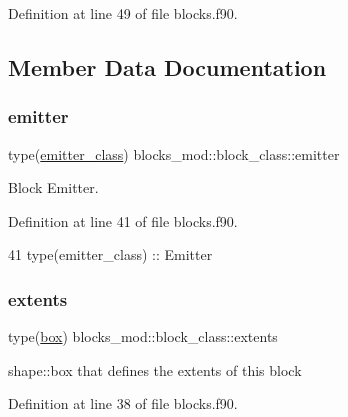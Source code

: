 Definition at line 49 of file blocks.\+f90.



\subsection{Member Data Documentation}
\mbox{\label{structblocks__mod_1_1block__class_a55e85183ba871abcaba1c00d5393611f}} 
\subsubsection{\texorpdfstring{emitter}{emitter}}
{\footnotesize\ttfamily type(\mbox{\hyperlink{structemitter__mod_1_1emitter__class}{emitter\+\_\+class}}) blocks\+\_\+mod\+::block\+\_\+class\+::emitter\hspace{0.3cm}{\ttfamily [private]}}



Block Emitter. 



Definition at line 41 of file blocks.\+f90.


\begin{DoxyCode}
41         \textcolor{keywordtype}{type}(emitter\_class) :: Emitter
\end{DoxyCode}
\mbox{\label{structblocks__mod_1_1block__class_aff3b0cb7d8248f8a87691a028de916d3}} 
\subsubsection{\texorpdfstring{extents}{extents}}
{\footnotesize\ttfamily type(\mbox{\hyperlink{structgeometry__mod_1_1box}{box}}) blocks\+\_\+mod\+::block\+\_\+class\+::extents\hspace{0.3cm}{\ttfamily [private]}}



shape\+::box that defines the extents of this block 



Definition at line 38 of file blocks.\+f90.


